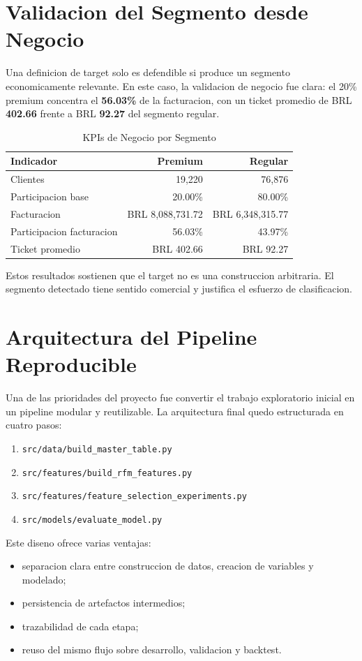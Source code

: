 \documentclass[12pt,letterpaper]{article}
\begin{document}
\section{Validacion del Segmento desde Negocio}
Una definicion de target solo es defendible si produce un segmento economicamente relevante. En este caso, la validacion de negocio fue clara: el 20\% premium concentra el \textbf{56.03\%} de la facturacion, con un ticket promedio de BRL \textbf{402.66} frente a BRL \textbf{92.27} del segmento regular.

\begin{table}[h]
\centering
\caption{KPIs de Negocio por Segmento}
\label{tab:ext_kpis}
\begin{tabular}{lrr}
\toprule
Indicador & Premium & Regular \\
\midrule
Clientes & 19,220 & 76,876 \\
Participacion base & 20.00\% & 80.00\% \\
Facturacion & BRL 8,088,731.72 & BRL 6,348,315.77 \\
Participacion facturacion & 56.03\% & 43.97\% \\
Ticket promedio & BRL 402.66 & BRL 92.27 \\
\bottomrule
\end{tabular}
\end{table}

Estos resultados sostienen que el target no es una construccion arbitraria. El segmento detectado tiene sentido comercial y justifica el esfuerzo de clasificacion.

\section{Arquitectura del Pipeline Reproducible}
Una de las prioridades del proyecto fue convertir el trabajo exploratorio inicial en un pipeline modular y reutilizable. La arquitectura final quedo estructurada en cuatro pasos:
\begin{enumerate}[label=\arabic*.]
    \item \texttt{src/data/build\_master\_table.py}
    \item \texttt{src/features/build\_rfm\_features.py}
    \item \texttt{src/features/feature\_selection\_experiments.py}
    \item \texttt{src/models/evaluate\_model.py}
\end{enumerate}

Este diseno ofrece varias ventajas:
\begin{itemize}
    \item separacion clara entre construccion de datos, creacion de variables y modelado;
    \item persistencia de artefactos intermedios;
    \item trazabilidad de cada etapa;
    \item reuso del mismo flujo sobre desarrollo, validacion y backtest.
\end{itemize}
\end{document}
